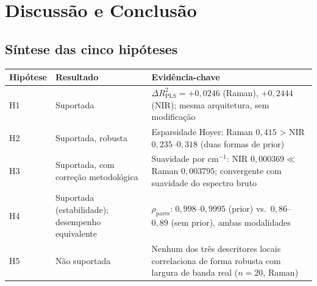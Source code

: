 %

\section{Discussão e Conclusão}
\label{sec:discussion}

\subsection{Síntese das cinco hipóteses}

\begin{center}
\begin{tabular}{p{1.3cm}p{6.3cm}p{5.5cm}}
\toprule
Hipótese & Resultado & Evidência-chave \\
\midrule
H1 & Suportada & $\Delta R^2_{\text{PLS}}=+0{,}0246$ (Raman), $+0{,}2444$ (NIR); mesma arquitetura, sem modificação \\
H2 & Suportada, robusta & Esparsidade Hoyer: Raman $0{,}415$ > NIR $0{,}235$--$0{,}318$ (duas formas de prior) \\
H3 & Suportada, com correção metodológica & Suavidade por cm$^{-1}$: NIR $0{,}000369 \ll$ Raman $0{,}003795$; convergente com suavidade do espectro bruto \\
H4 & Suportada (estabilidade); desempenho equivalente & $\rho_{\text{pares}}$: $0{,}998$--$0{,}9995$ (prior) vs.\ $0{,}86$--$0{,}89$ (sem prior), ambas modalidades \\
H5 & Não suportada & Nenhum dos três descritores locais correlaciona de forma robusta com largura de banda real ($n=20$, Raman) \\
\bottomrule
\end{tabular}
\end{center}

